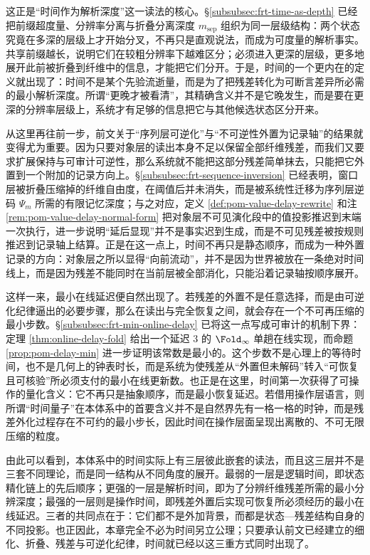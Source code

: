 这正是“时间作为解析深度”这一读法的核心。\S\ref{subsubsec:frt-time-as-depth} 已经把前缀超度量、分辨率分离与折叠分离深度 \(m_{\mathrm{sep}}\) 组织为同一层级结构：两个状态究竟在多深的层级上才开始分叉，不再只是直观说法，而成为可度量的解析事实。共享前缀越长，说明它们在较粗分辨率下越难区分；必须进入更深的层级，更多地展开此前被折叠到纤维中的信息，才能把它们分开。于是，时间的一个更内在的定义就出现了：时间不是某个先验流逝量，而是为了把残差转化为可断言差异所必需的最小解析深度。所谓“更晚才被看清”，其精确含义并不是它晚发生，而是要在更深的分辨率层级上，系统才有足够的信息把它与其他候选状态区分开来。

从这里再往前一步，前文关于“序列层可逆化”与“不可逆性外置为记录轴”的结果就变得尤为重要。因为只要对象层的读出本身不足以保留全部纤维残差，而我们又要求扩展保持与可审计可逆性，那么系统就不能把这部分残差简单抹去，只能把它外置到一个附加的记录方向上。\S\ref{subsubsec:frt-sequence-inversion} 已经表明，窗口层被折叠压缩掉的纤维自由度，在阈值后并未消失，而是被系统性迁移为序列层逆码 \(\Psi_m\) 所需的有限记忆深度；与之对应，定义 \ref{def:pom-value-delay-rewrite} 和注 \ref{rem:pom-value-delay-normal-form} 把对象层不可见演化段中的值投影推迟到末端一次执行，进一步说明“延后显现”并不是事实迟到生成，而是不可见残差被按规则推迟到记录轴上结算。正是在这一点上，时间不再只是静态顺序，而成为一种外置记录的方向：对象层之所以显得“向前流动”，并不是因为世界被放在一条绝对时间线上，而是因为残差不能同时在当前层被全部消化，只能沿着记录轴按顺序展开。

这样一来，最小在线延迟便自然出现了。若残差的外置不是任意选择，而是由可逆化纪律逼出的必要步骤，那么在读出与完全恢复之间，就会存在一个不可再压缩的最小步数。\S\ref{subsubsec:frt-min-online-delay} 已将这一点写成可审计的机制下界：定理 \ref{thm:online-delay-fold} 给出一个延迟 \(3\) 的 \(\Fold_\infty\) 单趟在线实现，而命题 \ref{prop:pom-delay-min} 进一步证明该常数是最小的。这个步数不是心理上的等待时间，也不是几何上的钟表时长，而是系统为使残差从“外置但未解码”转入“可恢复且可核验”所必须支付的最小在线更新数。也正是在这里，时间第一次获得了可操作的量化含义：它不再只是抽象顺序，而是最小恢复延迟。若借用操作层语言，则所谓“时间量子”在本体系中的首要含义并不是自然界先有一格一格的时钟，而是残差外化过程存在不可约的最小步长，因此时间在操作层面呈现出离散的、不可无限压缩的粒度。

由此可以看到，本体系中的时间实际上有三层彼此嵌套的读法，而且这三层并不是三套不同理论，而是同一结构从不同角度的展开。最弱的一层是逻辑时间，即状态精化链上的先后顺序；更强的一层是解析时间，即为了分辨纤维残差所需的最小分辨深度；最强的一层则是操作时间，即残差外置后实现可恢复所必须经历的最小在线延迟。三者的共同点在于：它们都不是外加背景，而都是状态—残差结构自身的不同投影。也正因此，本章完全不必为时间另立公理；只要承认前文已经建立的细化、折叠、残差与可逆化纪律，时间就已经以这三重方式同时出现了。

